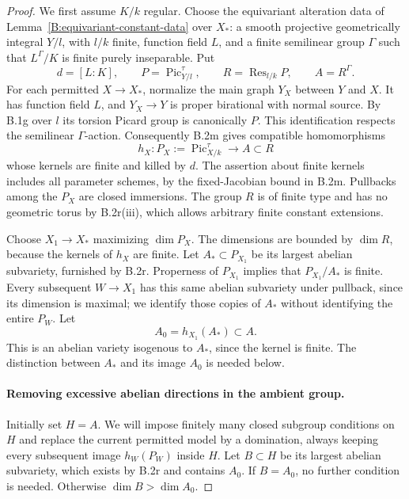 \begin{proof}
We first assume $K/k$ regular.  Choose the equivariant alteration
data of Lemma~\ref{B:equivariant-constant-data} over $X_*$:
a smooth projective geometrically integral $Y/l$, with $l/k$
finite, function field $L$, and a finite semilinear group
$\Gamma$ such that $L^\Gamma/K$ is finite purely inseparable.
Put
\[
 d=[L:K],\qquad P=\operatorname{Pic}^{\tau}_{Y/l},\qquad
 R=\operatorname{Res}_{l/k}P,\qquad A=R^\Gamma.
\]
For each permitted $X\to X_*$, normalize the main graph
$Y_X$ between $Y$ and $X$.  It has function field $L$, and
$Y_X\to Y$ is proper birational with normal source.  By B.1g
over $l$ its torsion Picard group is canonically $P$.
This identification respects the semilinear $\Gamma$-action.
Consequently B.2m gives compatible homomorphisms
\[
 h_X:P_X:=\operatorname{Pic}^{\tau}_{X/k}\longrightarrow A
           \subset R
\]
whose kernels are finite and killed by $d$.  The assertion
about finite kernels includes all parameter schemes, by the
fixed-Jacobian bound in B.2m.  Pullbacks among the $P_X$ are
closed immersions.  The group $R$ is of finite type and has
no geometric torus by B.2r(iii), which allows arbitrary finite
constant extensions.

Choose $X_1\to X_*$ maximizing $\dim P_X$.
The dimensions are bounded by $\dim R$, because the kernels
of $h_X$ are finite.  Let $A_*\subset P_{X_1}$ be its largest
abelian subvariety, furnished by B.2r.  Properness of $P_{X_1}$
implies that $P_{X_1}/A_*$ is finite.  Every subsequent
$W\to X_1$ has this same abelian subvariety under pullback,
since its dimension is maximal; we identify those copies of
$A_*$ without identifying the entire $P_W$.
Let
\[
                         A_0=h_{X_1}(A_*)\subset A.
\]
This is an abelian variety isogenous to $A_*$, since the
kernel is finite.  The distinction between $A_*$ and its
image $A_0$ is needed below.

\paragraph{Removing excessive abelian directions in the ambient group.}
Initially set $H=A$.  We will impose finitely many closed
subgroup conditions on $H$ and replace the current permitted
model by a domination, always keeping every subsequent image
$h_W(P_W)$ inside $H$.  Let $B\subset H$ be its largest
abelian subvariety, which exists by B.2r and contains $A_0$.
If $B=A_0$, no further condition is needed.
Otherwise $\dim B>\dim A_0$.


\end{proof}
